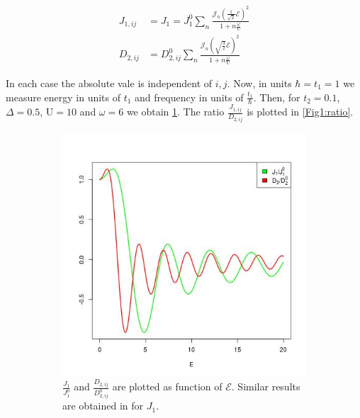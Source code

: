 \begin{align}
J_{1,ij} &= J_{1} = J_{1}^0  \sum_{n} \frac{\mathcal{J}_n(\frac{1}{\sqrt{2}}\mathcal{E})^2}{1+n\frac{\omega}{\text{U}}} \\
D_{2,ij} &= D_{2,ij}^0  \sum_{n} \frac{\mathcal{J}_n(\sqrt{\frac{3}{2}}\mathcal{E})^2}{1+n\frac{\omega}{\text{U}}}
\end{align}

In each case the absolute vale is independent of $i,j$.  Now, in units $\hbar=t_1=1$ we measure energy in units of $t_1$ and frequency in units of $\frac{t_1}{\hbar}$. Then, for $t_2 = 0.1$, $\Delta = 0.5$, $\text{U} = 10$ and $\omega = 6$ we obtain \ref{Fig1:NNvsNNN}. The ratio $\frac{J_{1,ij}}{D_{2,ij}}$ is plotted in \ref{Fig1:ratio}.

\begin{figure}
\centering
\begin{subfigure}{.5\textwidth}
  \centering
  \includegraphics[width=1\linewidth]{Chapters/NNvsNNN.jpg}
  \caption{$\frac{J_{1}}{J_{1}^0}$ and $\frac{D_{2,ij}}{D_{2,ij}^0}$ are plotted as function of $\mathcal{E}$. Similar results are obtained in \cite{Mentink2015} for $J_{1}$.}
  \label{Fig1:NNvsNNN}
\end{subfigure}%
\begin{subfigure}{.5\textwidth}
  \centering

\end{subfigure}
\end{figure}
